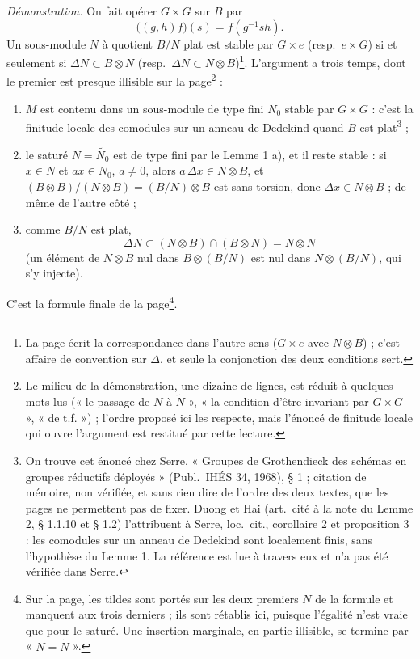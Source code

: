 \documentclass[11pt,a4paper]{article}
\begin{document}
\emph{Démonstration.} On fait opérer $G \times G$ sur $B$ par
\[
  \bigl((g,h)f\bigr)(s) = f(g^{-1} s h) .
\]
Un sous-module $N$ à quotient $B/N$ plat est stable par $G \times e$ (resp.\
$e \times G$) si et seulement si $\Delta N \subset B \otimes N$ (resp.\
$\Delta N \subset N \otimes B$)\footnote{La page écrit la correspondance
dans l'autre sens ($G \times e$ avec $N \otimes B$) ; c'est affaire de
convention sur $\Delta$, et seule la conjonction des deux conditions sert.}.
L'argument a trois temps, dont le premier est presque illisible sur la
page\footnote{Le milieu de la démonstration, une dizaine de lignes, est
réduit à quelques mots lus (« le passage de $N$ à $\widetilde{N}$ », « la
condition d'être invariant par $G \times G$ », « de t.f. ») ; l'ordre
proposé ici les respecte, mais l'énoncé de finitude locale qui ouvre
l'argument est restitué par cette lecture.} :
\begin{enumerate}
  \item $M$ est contenu dans un sous-module de type fini $N_0$ stable par
    $G \times G$ : c'est la finitude locale des comodules sur un anneau de
    Dedekind quand $B$ est plat\footnote{On trouve cet énoncé chez Serre,
    « Groupes de Grothendieck des schémas en groupes réductifs déployés »
    (Publ.\ IHÉS 34, 1968), § 1 ; citation de mémoire, non vérifiée, et sans
    rien dire de l'ordre des deux textes, que les pages ne permettent pas de
    fixer. Duong et Hai (art.\ cité à la note du Lemme 2, § 1.1.10 et § 1.2)
l'attribuent à Serre, loc.\ cit., corollaire 2 et proposition 3 : les comodules
sur un anneau de Dedekind sont localement finis, sans l'hypothèse du Lemme 1.
La référence est lue à travers eux et n'a pas été vérifiée dans Serre.} ;
  \item le saturé $N = \widetilde{N_0}$ est de type fini par le Lemme 1 a),
    et il reste stable : si $x \in N$ et $ax \in N_0$, $a \neq 0$, alors
    $a\,\Delta x \in N \otimes B$, et $(B \otimes B)/(N \otimes B) = (B/N)
    \otimes B$ est sans torsion, donc $\Delta x \in N \otimes B$ ; de même
    de l'autre côté ;
  \item comme $B/N$ est plat,
    \[
      \Delta N \subset (N \otimes B) \cap (B \otimes N) = N \otimes N
    \]
    (un élément de $N \otimes B$ nul dans $B \otimes (B/N)$ est nul dans
    $N \otimes (B/N)$, qui s'y injecte).
\end{enumerate}
C'est la formule finale de la page\footnote{Sur la page, les tildes sont
portés sur les deux premiers $N$ de la formule et manquent aux trois
derniers ; ils sont rétablis ici, puisque l'égalité n'est vraie que pour
le saturé. Une insertion marginale, en partie illisible, se termine par
« $N = \widetilde{N}$ ».}.
\end{document}
